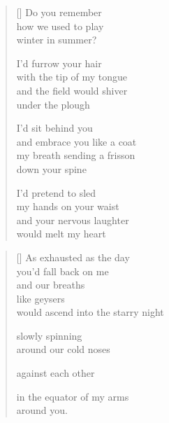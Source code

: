\documentclass[14pt]{extbook}
\newcommand*{\centeredornament}{\centerline{\pgfornament[width=6cm]{88}}}
\begin{document}

\newpage

\vspace*{-15mm}
\centeredornament
\vspace*{-7mm}


\settowidth{\versewidth}{and embrace you like a coat}

\begin{verse}[\versewidth]
  Do you remember \\
  how we used to play \\
  winter in summer?

  I'd furrow your hair \\
  with the tip of my tongue \\
  and the field would shiver \\
  under the plough

  I'd sit behind you \\
  and embrace you like a coat \\
  my breath sending a frisson \\
  down your spine

  I'd pretend to sled \\
  my hands on your waist \\
  and your nervous laughter \\
  would melt my heart
\end{verse}

\newpage

\settowidth{\versewidth}{would ascend into the starry night}

\begin{verse}[\versewidth]
  As exhausted as the day \\
  you'd fall back on me \\
  and our breaths \\
  like geysers \\
  would ascend into the starry night

  slowly spinning \\
  around our cold noses

  against each other

  in the equator of my arms \\
  around you.
\end{verse}

\end{document}
